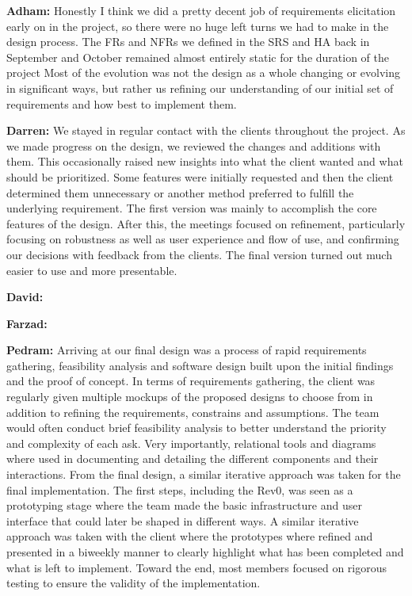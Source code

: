\documentclass{article}
\begin{document}

\textbf{Adham:} Honestly I think we did a pretty decent job of requirements elicitation early on in the project, so there were no huge left turns we had to make in the design
process. The FRs and NFRs we defined in the SRS and HA back in September and October remained almost entirely static for the duration of the project
Most of the evolution was not the design as a whole changing or evolving in significant ways, but rather us refining our understanding of our initial set of requirements
and how best to implement them.

\textbf{Darren:} We stayed in regular  contact with the clients throughout the project. As we made progress on the design, we reviewed the changes and additions with them. This occasionally raised new insights into what the client wanted and what should be prioritized. Some features were initially requested and then the client determined them unnecessary or another method preferred to fulfill the underlying requirement. The first version was mainly to accomplish the core features of the design. After this, the meetings focused on refinement, particularly focusing on robustness as well as user experience and flow of use, and confirming our decisions with feedback from the clients. The final version turned out much easier to use and more presentable.

\textbf{David:}

\textbf{Farzad:}

\textbf{Pedram:} Arriving at our final design was a process of rapid requirements gathering, feasibility analysis and software design built upon the initial findings and the 
proof of concept. In terms of requirements gathering, the client was regularly given multiple mockups of the proposed designs to choose from in addition to refining the 
requirements, constrains and assumptions. The team would often conduct brief feasibility analysis to better understand the priority and complexity of each ask. 
Very importantly, relational tools and diagrams where used in documenting and detailing the different components and their interactions.  
From the final design, a similar iterative approach was taken for the final implementation. 
The first steps, including the Rev0, was seen as a prototyping stage where the team made the basic infrastructure and user interface that could later be shaped in different 
ways. A similar iterative approach was taken with the client where the prototypes where refined and presented in a biweekly manner to clearly highlight what has been completed 
and what is left to implement. Toward the end, most members focused on rigorous testing to ensure the validity of the implementation.\\
\end{document}
